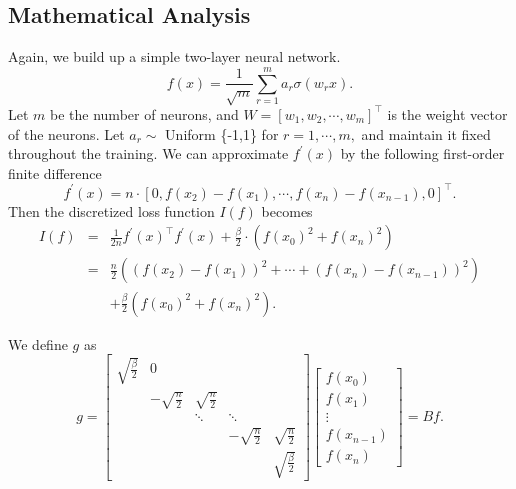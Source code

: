 \documentclass[letterpaper,12pt]{article}
\begin{document}
\subsection{Mathematical Analysis}
Again, we build up a simple two-layer neural network.
\begin{equation}
f(x)=\frac{1}{\sqrt{m}} \sum_{r=1}^{m} a_{r} \sigma\left(w_{r} x\right).
\end{equation}
Let $m$ be the number of neurons, and $W=[w_{1},w_{2}, \cdots, w_{m}]^{\top}$ is the weight vector of the neurons. Let $a_{r} \sim$ Uniform \{-1,1\} for $r=1, \cdots, m,$ and maintain it fixed throughout the training. 
We can approximate $f^{\prime}(x)$ by the following first-order finite difference
\begin{equation}
f^{\prime}(x)=n \cdot[0,f(x_{2})-f(x_{1}), \cdots, f(x_{n})-f(x_{n-1}),0]^{\top}.
\end{equation}
Then the discretized loss function $I(f)$ becomes
\begin{eqnarray}
I(f)&=&\frac{1}{2n} f^{\prime}(x)^{\top}  f^{\prime}(x)+\frac{\beta}{2} \cdot\left(f\left(x_{0}\right)^{2}+f\left(x_{n}\right)^{2}\right)\\
&=&\frac{n}{2}\left(\left(f\left(x_{2}\right)-f\left(x_{1}\right)\right)^{2}+\cdots+\left(f\left(x_{n}\right)-f\left(x_{n-1}\right)\right)^{2}\right)\\
&&+
\frac{\beta}{2}\left(f(x_{0})^{2}+f\left(x_{n}\right)^{2}\right).
\end{eqnarray}




We define $g$ as 
\begin{equation}
    g=\left[\begin{array}{ccccc}
        \sqrt{\frac{\beta}{2}}  & 0&& \\
         & -\sqrt{\frac{n}{2}} & \sqrt{\frac{n}{2}}\\
         &&\ddots&\ddots\\
         &&&-\sqrt{\frac{n}{2}} & \sqrt{\frac{n}{2}}\\
         &&&&\sqrt{\frac{\beta}{2}} 
    \end{array}\right]\left[\begin{array}{c}
f(x_{0}) \\
f(x_{1}) \\
\vdots\\
f(x_{n-1})\\
f(x_{n})
\end{array}\right]=Bf.
\end{equation}
\end{document}
